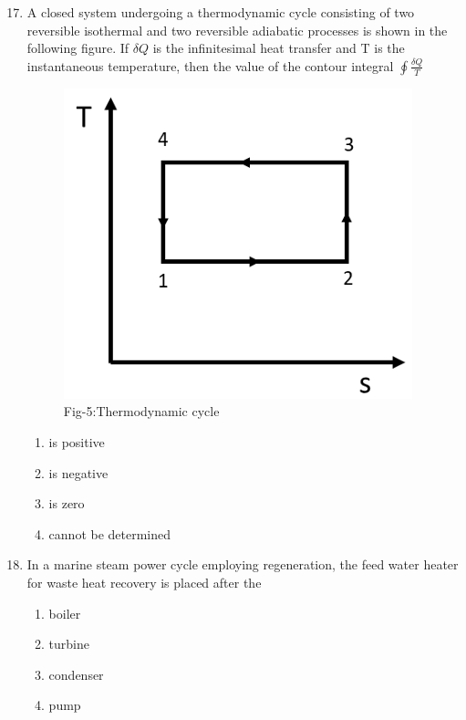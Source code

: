 \documentclass[journal]{IEEEtran}
\theoremstyle{remark}
\begin{document}
\begin{enumerate}[itemsep=1em]
\setcounter{enumi}{16}
\item A closed system undergoing a thermodynamic cycle consisting of two reversible isothermal and two reversible adiabatic processes is shown in the following figure. If $\delta Q$ is the infinitesimal heat transfer and T is the instantaneous 
temperature, then the value of the contour integral $\oint \frac{\delta Q}{T}$
\begin{figure}[H]
    \centering
    \includegraphics[width=0.4\columnwidth]{figs/fig-5.jpeg}
    \caption*{Fig-5:Thermodynamic cycle}
    \label{fig-5}
\end{figure}
\newpage
\vspace*{0.25cm}

\begin{enumerate}[leftmargin=2.5em, labelsep=0.5em, itemsep=0.5em]
      \item is positive 
      \item is negative 
      \item is zero 
      \item cannot be determined
\end{enumerate}

    
\end{enumerate}

\begin{enumerate}[itemsep=1em]
\setcounter{enumi}{17}
\item In a marine steam power cycle employing regeneration, the feed water heater for waste heat recovery is placed after the

\begin{multicols}{4}
\begin{enumerate}
      \item boiler
      \item turbine
      \item condenser
      \item pump
\end{enumerate}
\end{multicols}
\end{enumerate}
\end{document}
